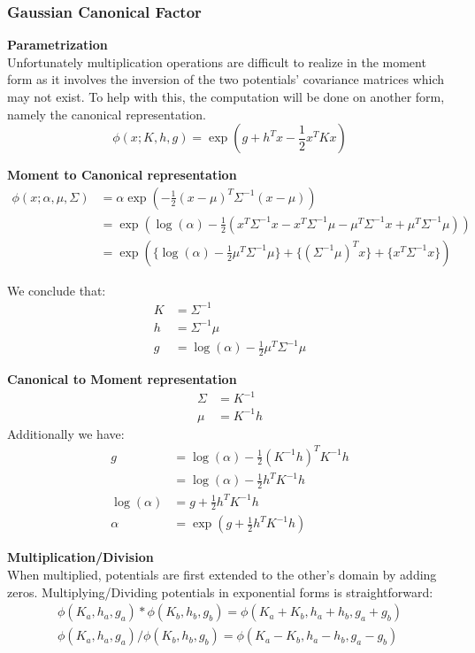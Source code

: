 \documentclass[11pt]{article}
\newcommand{\subsubsubsection}[1]{\noindent\textbf{#1}\\}
\begin{document}
\subsubsection{Gaussian Canonical Factor}
\subsubsubsection{Parametrization}
Unfortunately multiplication operations are difficult to realize in the moment form as it involves the inversion of the two potentials' covariance matrices which may not exist. To help with this, the computation will be done on another form, namely the canonical representation.
$$
\phi(x; K, h, g) = \exp(g+h^Tx - \frac{1}{2}x^TKx)
$$

\subsubsubsection{Moment to Canonical representation}
\begin{align*}
\phi(x; \alpha, \mu, \Sigma) &= \alpha \exp ( -\frac{1}{2} (x-\mu)^T\Sigma^{-1}(x-\mu)) \\
&= \exp ( \log (\alpha) - \frac{1}{2}(x^T\Sigma^{-1}x
                                     -x^T\Sigma^{-1}\mu
                                     -\mu^T\Sigma^{-1}x
                                     +\mu^T\Sigma^{-1}\mu
                                      ))\\
&= \exp ( \{\log (\alpha) - \frac{1}{2}\mu^T\Sigma^{-1}\mu\} + \{(\Sigma^{-1}\mu)^T x\} + \{x^T\Sigma^{-1}x\} )
\end{align*}

We conclude that:
\begin{align}
K &= \Sigma^{-1}\\
h &=\Sigma^{-1}\mu\\
g &= \log (\alpha) - \frac{1}{2}\mu^T\Sigma^{-1}\mu
\end{align}

\subsubsubsection{Canonical to Moment representation}
\begin{align}
\Sigma &= K^{-1}\\
\mu &=K^{-1}h \label{meanhCanonical}
\end{align}
Additionally we have:
\begin{align}
g&= \log (\alpha) - \frac{1}{2}(K^{-1}h)^TK^{-1}h \nonumber\\
&= \log (\alpha) - \frac{1}{2}h^TK^{-1}h \nonumber\\
\log (\alpha) &= g + \frac{1}{2}h^TK^{-1}h \nonumber\\
\alpha &= \exp(g + \frac{1}{2}h^TK^{-1}h )
\end{align}

\subsubsubsection{Multiplication/Division}
When multiplied, potentials are first extended to the other's domain by adding zeros. Multiplying/Dividing potentials in exponential forms is straightforward:
\begin{align}
\phi(K_a, h_a, g_a)*\phi(K_b, h_b, g_b) = \phi(K_a + K_b, h_a + h_b, g_a + g_b)\\
\phi(K_a, h_a, g_a)/\phi(K_b, h_b, g_b) = \phi(K_a - K_b, h_a - h_b, g_a - g_b)
\end{align}
\end{document}
